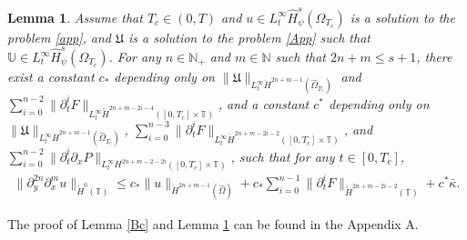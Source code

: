 \documentclass{amsart}
\numberwithin{equation}{section}
\newtheorem{lemma}{Lemma}[section]
\begin{document}
\begin{lemma}\label{bc}
Assume that $T_{c}\in (0,T)$ and $u\in L_{t}^{\infty}\hat{H}_{\psi}^{s}(\Omega_{T_{c}})$ is a solution to the problem \eqref{app},
and $\mathfrak{U}$ is a solution to the problem \eqref{App} such that $\mathbb{U}\in L_{t}^{\infty}\hat{H}_{\psi}^{s}(\Omega_{T_{c}})$.
For any $n\in\mathbb{N}_{+}$ and $m\in\mathbb{N}$ such that $2n+m\leq s+1$, there exist a constant $c_{*}$ depending only on $\|\mathfrak{U}\|_{L_{t}^{\infty}\ddot{H}^{2n+m-1}(\hat{\Omega}_{T_{c}})}$ and
$\sum\limits_{i=0}^{n-2}\|\partial_{t}^{i}F\|_{L_{t}^{\infty}\mathring{H}^{2n+m-2i-4}([0,T_{c}]\times\mathbb{T})}$,
and a constant  $c^{*}$ depending only on $\|\mathfrak{U}\|_{L_{t}^{\infty}\ddot{H}^{2n+m-1}(\hat{\Omega}_{T_{c}})}$,
$\sum\limits_{i=0}^{n-3}\|\partial_{t}^{i}F\|_{L_{t}^{\infty}\mathring{H}^{2n+m-2i-2}([0,T_{c}]\times\mathbb{T})}$,
and $\sum\limits_{i=0}^{n-2}\|\partial_{t}^{i}\partial_{x}P\|_{L_{t}^{\infty}H^{2n+m-2-2i}([0,T_{c}]\times\mathbb{T})}$,
such that for any $t\in [0,T_{c}]$,
\begin{align*}
\|\partial_{y}^{2n}\partial_{x}^{m}u\|_{\mathring{H}^{0}(\mathbb{T})}
\leq c_{*}\|u\|_{\ddot{H}^{2n+m-1}(\hat{\Omega})}
    +c_{*}\sum_{i=0}^{n-1}\|\partial_{t}^{i}F\|_{\mathring{H}^{2n+m-2i-2}(\mathbb{T})}
    +c^{*}\bar{\kappa}.
\end{align*}
\end{lemma}
The proof of Lemma \ref{Bc} and Lemma \ref{bc} can be found in the Appendix A.
\end{document}
